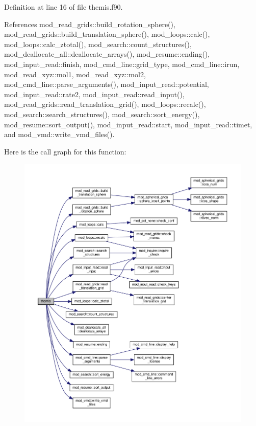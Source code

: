 Definition at line 16 of file themis.\+f90.



References mod\+\_\+read\+\_\+grids\+::build\+\_\+rotation\+\_\+sphere(), mod\+\_\+read\+\_\+grids\+::build\+\_\+translation\+\_\+sphere(), mod\+\_\+loops\+::calc(), mod\+\_\+loops\+::calc\+\_\+ztotal(), mod\+\_\+search\+::count\+\_\+structures(), mod\+\_\+deallocate\+\_\+all\+::deallocate\+\_\+arrays(), mod\+\_\+resume\+::ending(), mod\+\_\+input\+\_\+read\+::finish, mod\+\_\+cmd\+\_\+line\+::grid\+\_\+type, mod\+\_\+cmd\+\_\+line\+::irun, mod\+\_\+read\+\_\+xyz\+::mol1, mod\+\_\+read\+\_\+xyz\+::mol2, mod\+\_\+cmd\+\_\+line\+::parse\+\_\+arguments(), mod\+\_\+input\+\_\+read\+::potential, mod\+\_\+input\+\_\+read\+::rate2, mod\+\_\+input\+\_\+read\+::read\+\_\+input(), mod\+\_\+read\+\_\+grids\+::read\+\_\+translation\+\_\+grid(), mod\+\_\+loops\+::recalc(), mod\+\_\+search\+::search\+\_\+structures(), mod\+\_\+search\+::sort\+\_\+energy(), mod\+\_\+resume\+::sort\+\_\+output(), mod\+\_\+input\+\_\+read\+::start, mod\+\_\+input\+\_\+read\+::timet, and mod\+\_\+vmd\+::write\+\_\+vmd\+\_\+files().



Here is the call graph for this function\+:\nopagebreak
\begin{figure}[H]
\begin{center}
\leavevmode
\includegraphics[width=350pt]{themis_8f90_a9fc0d5fc4c1bc4e9a810629a4d8cf52a_cgraph}
\end{center}
\end{figure}


